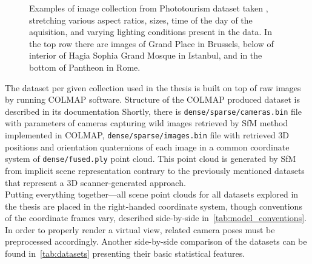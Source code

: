 \begin{figure}
\begin{subfigure}{.5\textwidth}
	\end{subfigure}
	\caption{Examples of image collection from Phototourism dataset taken , stretching various aspect ratios, sizes, time of the day of the
        aquisition, and varying lighting conditions present in the data. In the top
        row there are images of Grand Place in Brussels, below of interior of Hagia
        Sophia Grand Mosque in Istanbul, and in the bottom of Pantheon in
        Rome.}\label{fig:imc_dataset}
\end{figure}

The dataset per given collection used in the thesis is built on top of raw images by
running COLMAP software. Structure of the COLMAP produced dataset is described in its
documentation Shortly, there is
\verb|dense/sparse/cameras.bin| file with parameters of cameras capturing wild images
retrieved by SfM method implemented in COLMAP, \verb|dense/sparse/images.bin| file with
retrieved 3D positions and orientation quaternions of each image in a common coordinate
system of \verb|dense/fused.ply| point cloud. This point cloud is generated by SfM from
implicit scene representation contrary to the previously mentioned datasets that represent
a 3D scanner-generated approach.\\

Putting everything together---all scene point clouds for all datasets explored in the
thesis are placed in the right-handed coordinate system, though conventions of the
coordinate frames vary, described  side-by-side in~\cref{tab:model_conventions}. In order
to properly render a virtual view, related camera poses must be preprocessed accordingly.
Another side-by-side comparison of the datasets can be found in~\cref{tab:datasets}
presenting their basic statistical features.

